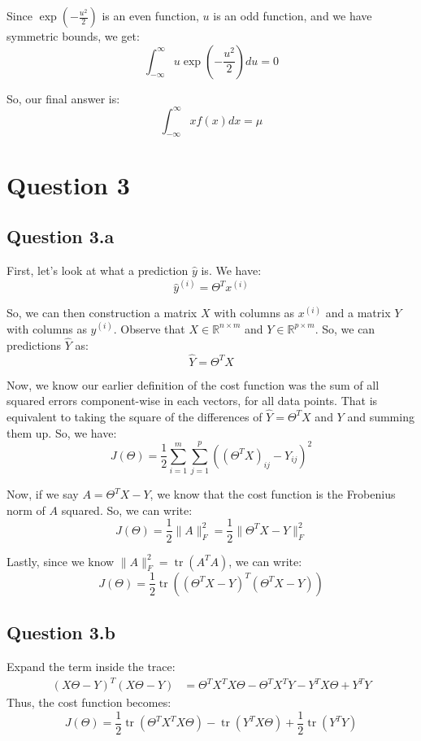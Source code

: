 \documentclass[a4paper]{article}
\begin{document}
\noindent Since $\exp\left(-\frac{u^2}{2}\right)$ is an even function, $u$ is an odd function, and we have symmetric bounds, we get:
\[
\int_{-\infty}^{\infty} u \exp\left(-\frac{u^2}{2}\right) du = 0
\]

\noindent So, our final answer is:
\[
\int_{-\infty}^{\infty} x f(x) dx = \mu
\]

\newpage
\section*{Question 3}
\subsection*{Question 3.a}

First, let's look at what a prediction $\hat{y}$ is. We have:
\[
\hat{y}^{(i)} = \Theta^T x^{(i)}
\]

\noindent So, we can then construction a matrix $X$ with columns as $x^{(i)}$ and a matrix $Y$ with columns as $y^{(i)}$. Observe that $X \in \mathbb{R}^{n \times m}$ and $Y \in \mathbb{R}^{p \times m}$. So, we can predictions $\hat{Y}$ as:
\[
\hat{Y} = \Theta^T X
\]

\noindent Now, we know our earlier definition of the cost function was the sum of all squared errors component-wise in each vectors, for all data points. That is equivalent to taking the square of the differences of $\hat{Y} = \Theta^T X$ and $Y$ and summing them up. So, we have:
\[
J(\Theta) = \frac{1}{2} \sum_{i=1}^m \sum_{j=1}^p \left((\Theta^T X)_{ij} - Y_{ij}\right)^2
\]

\noindent Now, if we say $A = \Theta^T X - Y$, we know that the cost function is the Frobenius norm of $A$ squared. So, we can write:
\[
J(\Theta) = \frac{1}{2} \|A\|_F^2 = \frac{1}{2}\| \Theta^T X - Y \|_F^2
\]

\noindent Lastly, since we know $\|A\|_F^2 = \operatorname{tr}(A^T A)$, we can write:
\[
J(\Theta) = \frac{1}{2} \operatorname{tr}\left((\Theta^T X - Y)^T (\Theta^T X - Y)\right)
\]

\vspace{2mm}
\subsection*{Question 3.b}
Expand the term inside the trace:
\[
\begin{aligned}
(X\Theta - Y)^T (X\Theta - Y) &= \Theta^T X^T X \Theta - \Theta^T X^T Y - Y^T X\Theta + Y^T Y
\end{aligned}
\]
Thus, the cost function becomes:
\[
J(\Theta) = \frac{1}{2}\operatorname{tr}\left(\Theta^T X^T X \Theta\right) - \operatorname{tr}\left(Y^T X \Theta\right) + \frac{1}{2}\operatorname{tr}\left(Y^T Y\right)
\]
\end{document}
